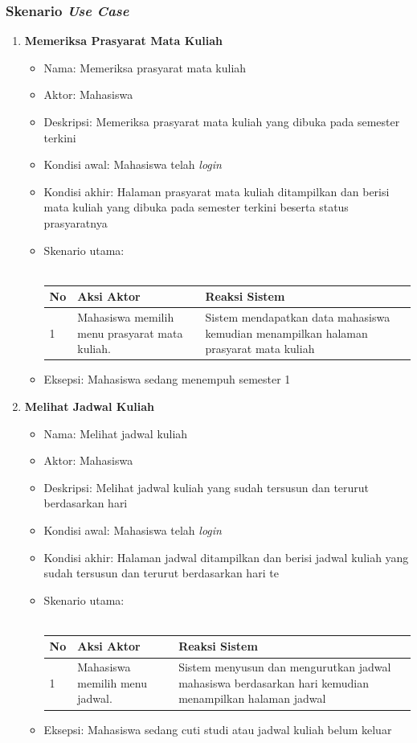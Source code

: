\subsubsection{Skenario \textit{Use Case}}

\begin{enumerate}
	\item \textbf{Memeriksa Prasyarat Mata Kuliah}
		\begin{itemize}
			\item Nama: Memeriksa prasyarat mata kuliah
			\item Aktor: Mahasiswa
			\item Deskripsi: Memeriksa prasyarat mata kuliah yang dibuka pada semester terkini
			\item Kondisi awal: Mahasiswa telah \textit{login}
			\item Kondisi akhir: Halaman prasyarat mata kuliah ditampilkan dan berisi mata kuliah yang dibuka pada semester terkini beserta status prasyaratnya
			\item Skenario utama: \\ \\
				\begin{tabular}{|p{0.5cm} |p{6cm}| p{6cm}|}
						\hline
							No 	& Aksi Aktor & Reaksi Sistem \\ \hline
							1 	& Mahasiswa memilih menu prasyarat mata kuliah. 	&	Sistem mendapatkan data mahasiswa kemudian menampilkan halaman prasyarat mata kuliah \\ \hline 
						\end{tabular} 
			\item Eksepsi: Mahasiswa sedang menempuh semester 1
		\end{itemize}
		
	\item \textbf{Melihat Jadwal Kuliah}
		\begin{itemize}
			\item Nama: Melihat jadwal kuliah
			\item Aktor: Mahasiswa
			\item Deskripsi: Melihat jadwal kuliah yang sudah tersusun dan terurut berdasarkan hari
			\item Kondisi awal: Mahasiswa telah \textit{login}
			\item Kondisi akhir: Halaman jadwal ditampilkan dan berisi jadwal kuliah yang sudah tersusun dan terurut berdasarkan hari te
			\item Skenario utama: \\ \\
				\begin{tabular}{|p{0.5cm} |p{6cm}| p{6cm}|}
						\hline
							No 	& Aksi Aktor & Reaksi Sistem \\ \hline
							1 	& Mahasiswa memilih menu jadwal. 	&	Sistem menyusun dan mengurutkan jadwal mahasiswa berdasarkan hari kemudian menampilkan halaman jadwal \\ \hline 
						\end{tabular} 
			\item Eksepsi: Mahasiswa sedang cuti studi atau jadwal kuliah belum keluar
		\end{itemize}
		

\end{enumerate}
